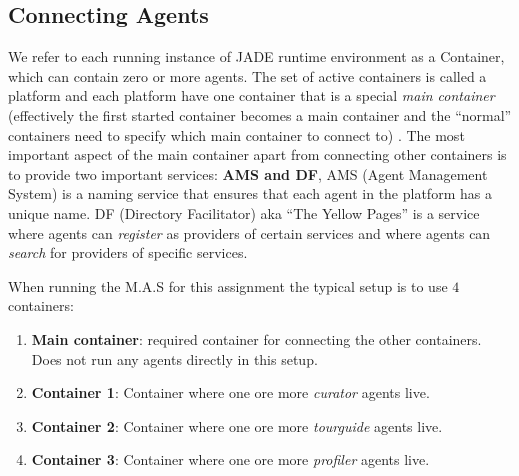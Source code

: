 \documentclass[a4paper, 11pt]{article}
\begin{document}
\subsection*{Connecting Agents}
We refer to each running instance of JADE runtime environment as a Container, which can contain zero or more agents. The set of active containers is called a platform and each platform have one container that is a special \textit{main container} (effectively the first started container becomes a main container and the ``normal'' containers need to specify which main container to connect to) \citep{jade_tutorial}. The most important aspect of the main container apart from connecting other containers is to provide two important services: \textbf{AMS and DF}, AMS (Agent Management System) is a naming service that ensures that each agent in the platform has a unique name. DF (Directory Facilitator) aka ``The Yellow Pages'' is a service where agents can \textit{register} as providers of certain services and where agents can \textit{search} for providers of specific services. 

When running the M.A.S for this assignment the typical setup is to use $4$ containers:
\begin{enumerate}[I]
\item \textbf{Main container}: required container for connecting the other containers. Does not run any agents directly in this setup.
\item \textbf{Container 1}: Container where one ore more \textit{curator} agents live.
\item \textbf{Container 2}: Container where one ore more \textit{tourguide} agents live.
\item \textbf{Container 3}: Container where one ore more \textit{profiler} agents live.
\end{enumerate}
\end{document}
